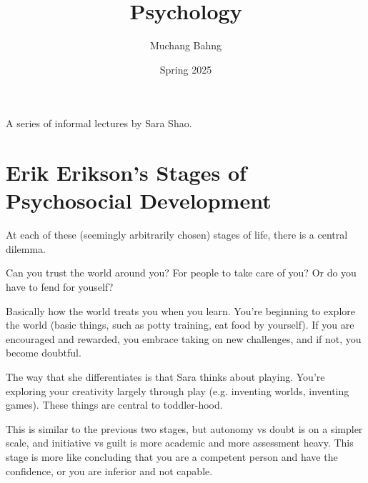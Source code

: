 \documentclass{article}
\begin{document}
\title{Psychology}
\author{Muchang Bahng}
\date{Spring 2025}

\maketitle
\tableofcontents
\pagebreak

  A series of informal lectures by Sara Shao. 
  
\section{Erik Erikson's Stages of Psychosocial Development} 

  At each of these (seemingly arbitrarily chosen) stages of life, there is a central dilemma. 
  \begin{definition}
    \label{def:0-18-months-trust-vs-mistrust}
    Can you trust the world around you? For people to take care of you? Or do you have to fend for youself?
  \end{definition}

  \begin{definition}
    \label{def:18-months-to-3-years-autonomy-vs-shame-doubt}
    Basically how the world treats you when you learn. You're beginning to explore the world (basic things, such as potty training, eat food by yourself). If you are encouraged and rewarded, you embrace taking on new challenges, and if not, you become doubtful. 
  \end{definition}

  \begin{definition}
    \label{def:3-to-5-years-initiative-vs-guilt}
    The way that she differentiates is that Sara thinks about playing. You're exploring your creativity largely through play (e.g. inventing worlds, inventing games). These things are central to toddler-hood. 
  \end{definition}

  \begin{definition}
    \label{def:5-to-13-years-industry-vs-inferiority}
    This is similar to the previous two stages, but autonomy vs doubt is on a simpler scale, and initiative vs guilt is more academic and more assessment heavy. This stage is more like concluding that you are a competent person and have the confidence, or you are inferior and not capable. 
  \end{definition}
\end{document}
